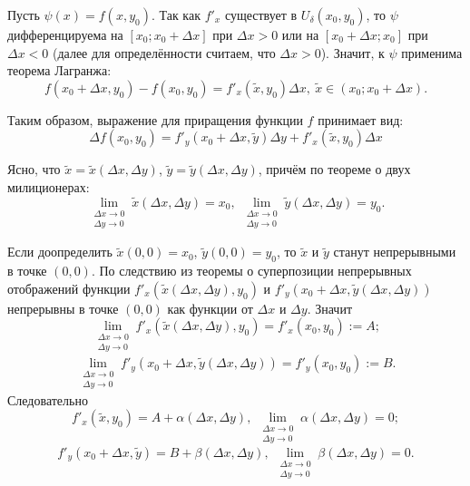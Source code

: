 \documentclass[12pt, a4paper, reqno]{article}
\begin{document}
    Пусть $\psi(x) = f(x, y_0)$. Так как $f'_x$ существует в $U_{\delta}(x_0, y_0)$, то $\psi$
    дифференцируема на $[x_0; x_0 + \Delta x]$ при $\Delta x > 0$ или на $[x_0 + \Delta x; x_0]$ при
    $\Delta x < 0$ (далее для определённости считаем, что $\Delta x > 0$). Значит, к $\psi$ применима
    теорема Лагранжа:
    \begin{equation*}
        f(x_0 + \Delta x, y_0) - f(x_0, y_0) = f'_x(\tilde{x}, y_0) \Delta x,\
        \tilde{x} \in (x_0; x_0 + \Delta x).
    \end{equation*}

    Таким образом, выражение для приращения функции $f$ принимает вид:
    \begin{equation*}
        \Delta f(x_0, y_0) = f'_y(x_0 + \Delta x, \tilde{y}) \Delta y + f'_x(\tilde{x}, y_0) \Delta x
    \end{equation*}

    Ясно, что $\tilde{x} = \tilde{x}(\Delta x, \Delta y)$, $\tilde{y} = \tilde{y}(\Delta x, \Delta y)$,
    причём по теореме о двух милиционерах:
    \begin{equation*}
        \lim\limits_{\substack{\Delta x \to 0 \\ \Delta y \to 0}} \tilde{x}(\Delta x, \Delta y) = x_0,\
        \lim\limits_{\substack{\Delta x \to 0 \\ \Delta y \to 0}} \tilde{y}(\Delta x, \Delta y) = y_0.
    \end{equation*}

    Если доопределить $\tilde{x}(0, 0) = x_0$, $\tilde{y}(0, 0) = y_0$, то $\tilde{x}$ и $\tilde{y}$
    станут непрерывными в точке $(0, 0)$. По следствию из теоремы о суперпозиции непрерывных отображений
    функции $f'_x(\tilde{x}(\Delta x, \Delta y), y_0)$ и $f'_y(x_0 + \Delta x, \tilde{y}(\Delta x, \Delta y))$
    непрерывны в точке $(0, 0)$ как функции от $\Delta x$ и $\Delta y$. Значит
    \begin{equation*}
        \lim\limits_{\substack{\Delta x \to 0 \\ \Delta y \to 0}}
            f'_x(\tilde{x}(\Delta x, \Delta y), y_0) = f'_x(x_0, y_0) := A;
    \end{equation*}
    \begin{equation*}
        \lim\limits_{\substack{\Delta x \to 0 \\ \Delta y \to 0}}
            f'_y(x_0 + \Delta x, \tilde{y}(\Delta x, \Delta y)) = f'_y(x_0, y_0) := B.
    \end{equation*}
    Следовательно
    \begin{equation*}
        f'_x(\tilde{x}, y_0) = A + \alpha(\Delta x, \Delta y),\
        \lim\limits_{\substack{\Delta x \to 0 \\ \Delta y \to 0}} \alpha(\Delta x, \Delta y) = 0;
    \end{equation*}
    \begin{equation*}
        f'_y(x_0 + \Delta x, \tilde{y}) = B + \beta(\Delta x, \Delta y),\
        \lim\limits_{\substack{\Delta x \to 0 \\ \Delta y \to 0}} \beta(\Delta x, \Delta y) = 0.
    \end{equation*}
\end{document}
